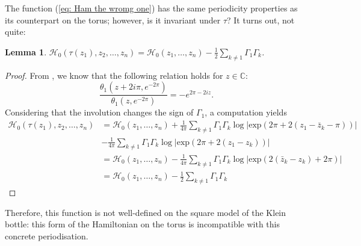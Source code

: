\documentclass[11pt,twoside]{article}
\newtheorem{lem}[theorem]{Lemma}
\theoremstyle{definition}
\numberwithin{equation}{section}
\begin{document}
The function (\ref{eq: Ham the wromg one}) has the same periodicity properties as its counterpart on the torus; however, is it invariant under $\tau$? It turns out, not quite:
\begin{lem}
$\mathcal{H}_0(\tau(z_1), z_2,\ldots,z_n) = \mathcal{H}_0(z_1,\ldots,z_n) - \frac12\sum\limits_{k\ne 1}\Gamma_1\Gamma_k$.
\end{lem}
\begin{proof}
From \cite{whittaker2020course}, we know that the following relation holds for $z\in\mathbb{C}$:
\[
\frac{\theta_1(z + 2i\pi, e^{-2\pi})}{\theta_1(z, e^{-2\pi})} = -e^{2\pi -2iz}.
\]
Considering that the involution changes the sign of $\Gamma_1$, a computation yields 
\begin{equation*}
    \begin{split}
        \mathcal{H}_0(\tau(z_1), z_2,\ldots,z_n) &= \mathcal{H}_0(z_1,\ldots,z_n) + \frac{1}{4\pi}\sum_{k\ne 1}\Gamma_1\Gamma_k\log\left|\mathrm{exp}\left(2\pi + 2(z_1 - \bar{z}_k - \pi)\right)\right| \\&- \frac{1}{4\pi}\sum_{k\ne 1}\Gamma_1\Gamma_k\log\left|\mathrm{exp}\left(2\pi + 2(z_1-z_k)\right)\right|\\&=\mathcal{H}_0(z_1,\ldots,z_n) - \frac{1}{4\pi}\sum_{k\ne 1}\Gamma_1\Gamma_k\log\left|\mathrm{exp}\left(2(\bar{z}_k-z_k) + 2\pi\right)\right| \\&= \mathcal{H}_0(z_1,\ldots,z_n)- \frac{1}{2}\sum_{k\ne 1}\Gamma_1\Gamma_k
    \end{split}
\end{equation*}
\end{proof}

Therefore, this function is not well-defined on the square model of the Klein bottle: this form of the Hamiltonian on the torus is incompatible with this concrete periodisation. 
\end{document}
